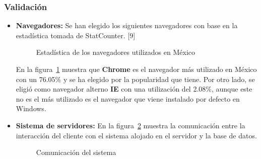 	
	
		
	\subsubsection{Validación}
	
		\begin{itemize}
			
			\item \textbf{Navegadores:} Se han elegido los siguientes navegadores con base en la estadística tomada de StatCounter. [9] 
			
			\begin{figure}[htbp!]
				\begin{center}
					\caption{Estadística de los navegadores utilizados en México}
					\label{fig:navegadores}
				\end{center}
			\end{figure}
			
			En la figura~\ref{fig:navegadores} muestra que \textbf{Chrome} es el navegador más utilizado en México con un 76.05\% y se ha elegido por la popularidad que tiene. Por otro lado, se eligió como navegador alterno \textbf{IE} con una utilización del 2.08\%, aunque este no es el más utilizado es el navegador que viene instalado por defecto en Windows.
			
			\item \textbf{Sistema de servidores:} En la figura~\ref{fig:servidor} muestra la comunicación entre la interacción del cliente con el sistema alojado en el servidor y la base de datos.
			
			\begin{figure}[htbp!]
				\begin{center}
					\caption{Comunicación del sistema}
					\label{fig:servidor}
				\end{center}
			\end{figure}
			

\end{itemize}
